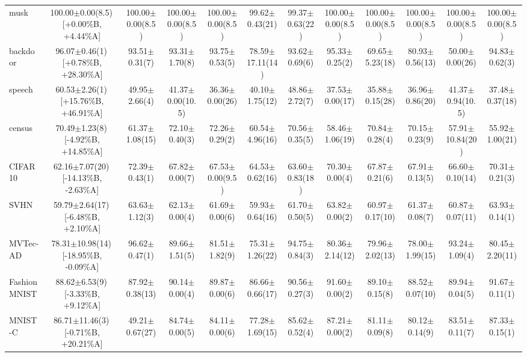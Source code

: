 \documentclass[conference]{IEEEtran}
\begin{document}
\begin{table}
{\begin{tabular}{lccccccccccc}
				musk & 100.00$\pm$0.00(8.5)\,[{+}0.00\%B, {+}4.44\%A] & 100.00$\pm$0.00(8.5) & 100.00$\pm$0.00(8.5) & 100.00$\pm$0.00(8.5) & 99.62$\pm$0.43(21) & 99.37$\pm$0.63(22) & 100.00$\pm$0.00(8.5) & 100.00$\pm$0.00(8.5) & 100.00$\pm$0.00(8.5) & 100.00$\pm$0.00(8.5) & 100.00$\pm$0.00(8.5) \\
				backdoor & 96.07$\pm$0.46(1)\,[{+}0.78\%B, {+}28.30\%A] & 93.51$\pm$0.31(7) & 93.31$\pm$1.70(8) & 93.75$\pm$0.53(5) & 78.59$\pm$17.11(14) & 93.62$\pm$0.69(6) & 95.33$\pm$0.25(2) & 69.65$\pm$5.23(18) & 80.93$\pm$0.56(13) & 50.00$\pm$0.00(26) & 94.83$\pm$0.62(3) \\
				speech & 60.53$\pm$2.26(1)\,[{+}15.76\%B, {+}46.91\%A] & 49.95$\pm$2.66(4) & 41.37$\pm$0.00(10.5) & 36.36$\pm$0.00(26) & 40.10$\pm$1.75(12) & 48.86$\pm$2.72(7) & 37.53$\pm$0.00(17) & 35.88$\pm$0.15(28) & 36.96$\pm$0.86(20) & 41.37$\pm$0.94(10.5) & 37.48$\pm$0.37(18) \\
				census & 70.49$\pm$1.23(8)\,[{-}4.92\%B, {+}14.85\%A] & 61.37$\pm$1.08(15) & 72.10$\pm$0.40(3) & 72.26$\pm$0.29(2) & 60.54$\pm$4.96(16) & 70.56$\pm$0.35(5) & 58.46$\pm$1.06(19) & 70.84$\pm$0.28(4) & 70.15$\pm$0.23(9) & 57.91$\pm$10.84(20) & 55.92$\pm$1.00(21) \\
				CIFAR10 & 62.16$\pm$7.07(20)\,[{-}14.13\%B, {-}2.63\%A] & 72.39$\pm$0.43(1) & 67.82$\pm$0.00(7) & 67.53$\pm$0.00(9.5) & 64.53$\pm$0.62(16) & 63.60$\pm$0.83(18) & 70.30$\pm$0.00(4) & 67.87$\pm$0.21(6) & 67.91$\pm$0.13(5) & 66.60$\pm$0.10(14) & 70.31$\pm$0.21(3) \\
				SVHN & 59.79$\pm$2.64(17)\,[{-}6.48\%B, {+}2.10\%A] & 63.63$\pm$1.12(3) & 62.13$\pm$0.00(4) & 61.69$\pm$0.00(6) & 59.93$\pm$0.64(16) & 61.70$\pm$0.50(5) & 63.82$\pm$0.00(2) & 60.97$\pm$0.17(10) & 61.37$\pm$0.08(7) & 60.87$\pm$0.07(11) & 63.93$\pm$0.14(1) \\
				MVTec-AD & 78.31$\pm$10.98(14)\,[{-}18.95\%B, {-}0.09\%A] & 96.62$\pm$0.47(1) & 89.66$\pm$1.51(5) & 81.51$\pm$1.82(9) & 75.31$\pm$1.26(22) & 94.75$\pm$0.84(3) & 80.36$\pm$2.14(12) & 79.96$\pm$2.02(13) & 78.00$\pm$1.99(15) & 93.24$\pm$1.09(4) & 80.45$\pm$2.20(11) \\
				FashionMNIST & 88.62$\pm$6.53(9)\,[{-}3.33\%B, {+}9.12\%A] & 87.92$\pm$0.38(13) & 90.14$\pm$0.00(4) & 89.87$\pm$0.00(6) & 86.66$\pm$0.66(17) & 90.56$\pm$0.27(3) & 91.60$\pm$0.00(2) & 89.10$\pm$0.15(8) & 88.52$\pm$0.07(10) & 89.94$\pm$0.04(5) & 91.67$\pm$0.11(1) \\
				MNIST-C & 86.71$\pm$11.46(3)\,[{-}0.71\%B, {+}20.21\%A] & 49.21$\pm$0.67(27) & 84.74$\pm$0.00(5) & 84.11$\pm$0.00(6) & 77.28$\pm$1.69(15) & 85.62$\pm$0.52(4) & 87.21$\pm$0.00(2) & 81.11$\pm$0.09(8) & 80.12$\pm$0.14(9) & 83.51$\pm$0.11(7) & 87.33$\pm$0.15(1) \\

\end{tabular}}
\end{table}
\end{document}
